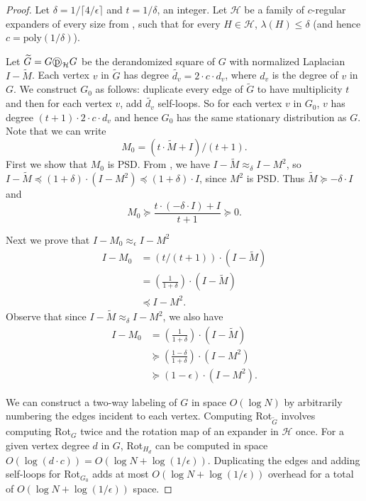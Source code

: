 \documentclass{toc}
\newcommand{\wt}{\widetilde}   %
\newcommand{\dpr}{\text{\textcircled{p}}_{\mathcal{H}}}
\numberwithin{myalgctr}{section}
\theoremstyle{named}
\begin{document}
\begin{proof}
Let $\delta=1/\lceil{4/\epsilon}\rceil$ and $t=1/\delta$, an integer. Let $\mathcal{H}$ be a family of $c$-regular expanders of every size from , such that for every $H\in\mathcal{H}$, $\lambda(H)\leq \delta$ (and hence $c=\mathrm{poly}(1/\delta)$). 

Let $\wt{G}=G\dpr G$ be the derandomized square of $G$ with normalized Laplacian $I-\wt{M}$. Each vertex $v$ in $\wt{G}$ has degree $\wt{d_v}=2\cdot c\cdot d_v$, where $d_v$ is the degree of $v$ in $G$. We construct $G_0$ as follows: duplicate every edge of $\wt{G}$ to have multiplicity $t$ and then for each vertex $v$, add $\wt{d_v}$ self-loops. So for each vertex $v$ in $G_0$, $v$ has degree $(t+1)\cdot 2\cdot c\cdot d_v$ and hence $G_0$ has the same stationary distribution as $G$. Note that we can write 
\[
M_0 = (t\cdot \wt{M} + I)/(t+1).
\]
First we show that $M_0$ is PSD. {}From , we have $I-\wt{M}\approx_{\delta}I-M^2$, so $I-\wt{M}\preceq (1+\delta)\cdot (I-M^2)\preceq (1+\delta)\cdot I$, since $M^2$ is PSD. Thus $\wt{M}\succeq -\delta\cdot I$ and
\[
M_0\succeq\frac{t\cdot(-\delta \cdot I)+I}{t+1}\succeq 0.
\]

Next we prove that $I-M_0\approx_{\epsilon}I-M^2$ 
\begin{align*}
I-M_0&=(t/(t+1))\cdot(I-\wt{M})\\
&=\left(\frac{1}{1+\delta}\right)\cdot(I-\wt{M})\\
&\preceq I-M^2.
\end{align*}
Observe that since $I-\wt{M}\approx_{\delta} I-M^2$, we also have
\begin{align*}
I-M_0&=\left(\frac{1}{1+\delta}\right)\cdot(I-\wt{M})\\
&\succeq \left(\frac{1-\delta}{1+\delta}\right)\cdot(I-M^2)\\
&\succeq (1-\epsilon)\cdot(I-M^2).
\end{align*}

We can construct a two-way labeling of $G$ in space $O(\log N)$ by arbitrarily numbering the edges incident to each vertex. Computing Rot$_{\wt{G}}$ involves computing Rot$_G$ twice and the rotation map of an expander in $\mathcal{H}$ once. For a given vertex degree $d$ in $G$, Rot$_{H_{d}}$ can be computed in space $O(\log (d\cdot c))=O(\log N + \log(1/\epsilon))$. Duplicating the edges and adding self-loops for Rot$_{G_0}$ adds at most $O(\log N+\log(1/\epsilon))$ overhead for a total of $O(\log N+\log(1/\epsilon))$ space.
\end{proof}
\end{document}
